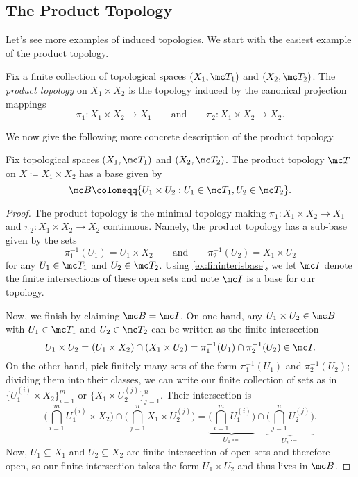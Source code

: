 \documentclass[../notes.tex]{subfiles}
\begin{document}
\subsection{The Product Topology}
Let's see more examples of induced topologies. We start with the easiest example of the product topology.
\begin{defihelper}
	Fix a finite collection of topological spaces $(X_1,\mc T_1)$ and $(X_2,\mc T_2)$. The \textit{product topology} on $X_1\times X_2$ is the topology induced by the canonical projection mappings
	\[\pi_1\colon X_1\times X_2\to X_1\qquad\text{and}\qquad\pi_2\colon X_1\times X_2\to X_2.\]
\end{defihelper}
We now give the following more concrete description of the product topology.
\begin{lemma} \label{lem:twoprodtop}
	Fix topological spaces $(X_1,\mc T_1)$ and $(X_2,\mc T_2)$. The product topology $\mc T$ on $X\coloneqq X_1\times X_2$ has a base given by
	\[\mc B\coloneqq\{U_1\times U_2:U_1\in\mc T_1,U_2\in\mc T_2\}.\]
\end{lemma}
\begin{proof}
	The product topology is the minimal topology making $\pi_1\colon X_1\times X_2\to X_1$ and $\pi_2\colon X_1\times X_2\to X_2$ continuous. Namely, the product topology has a sub-base given by the sets
	\[\pi_1^{-1}(U_1)=U_1\times X_2\qquad\text{and}\qquad\pi_2^{-1}(U_2)=X_1\times U_2\]
	for any $U_1\in\mc T_1$ and $U_2\in\mc T_2$. Using \autoref{ex:fininterisbase}, we let $\mc I$ denote the finite intersections of these open sets and note $\mc I$ is a base for our topology.
	
	Now, we finish by claiming $\mc B=\mc I$. On one hand, any $U_1\times U_2\in\mc B$ with $U_1\in\mc T_1$ and $U_2\in\mc T_2$ can be written as the finite intersection
	\[U_1\times U_2=(U_1\times X_2)\cap(X_1\times U_2)=\pi_1^{-1}(U_1)\cap\pi_2^{-1}(U_2)\in\mc I.\]
	On the other hand, pick finitely many sets of the form $\pi_1^{-1}(U_1)$ and $\pi_2^{-1}(U_2)$; dividing them into their classes, we can write our finite collection of sets as in $\{U_1^{(i)}\times X_2\}_{i=1}^m$ or $\{X_1\times U_2^{(j)}\}_{j=1}^n$. Their intersection is
	\[\Bigg(\bigcap_{i=1}^mU_1^{(i)}\times X_2\Bigg)\cap\Bigg(\bigcap_{j=1}^nX_1\times U_2^{(j)}\Bigg)=\underbrace{\Bigg(\bigcap_{i=1}^mU_1^{(i)}\Bigg)}_{U_1\coloneqq}\cap\underbrace{\Bigg(\bigcap_{j=1}^nU_2^{(j)}\Bigg)}_{U_2\coloneqq}.\]
	Now, $U_1\subseteq X_1$ and $U_2\subseteq X_2$ are finite intersection of open sets and therefore open, so our finite intersection takes the form $U_1\times U_2$ and thus lives in $\mc B$.
\end{proof}
\end{document}
